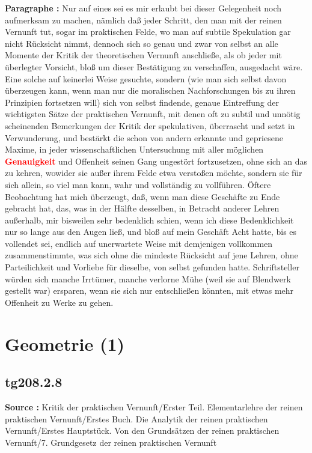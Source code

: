 \documentclass[a4paper,12pt,twoside]{book}
\newcommand{\match}[1]{\textcolor{red}{\textbf{#1}}}
\newcommand{\unnumberedsection}[1]{
	\section*{#1}
	\addcontentsline{toc}{section}{#1}
	\markright{#1}
}
\begin{document}
	\textbf{Paragraphe : }Nur auf eines sei es mir erlaubt bei dieser Gelegenheit noch aufmerksam zu machen, nämlich daß jeder Schritt, den man mit der reinen Vernunft tut, sogar im praktischen Felde, wo man auf subtile Spekulation gar nicht Rücksicht nimmt, dennoch sich so genau und zwar von selbst an alle Momente der Kritik der theoretischen Vernunft anschließe, als ob jeder mit überlegter Vorsicht, bloß um dieser Bestätigung zu verschaffen, ausgedacht wäre. Eine solche auf keinerlei Weise gesuchte, sondern (wie man sich selbst davon überzeugen kann, wenn man nur die moralischen Nachforschungen bis zu ihren Prinzipien fortsetzen will) sich von selbst findende, genaue Eintreffung der wichtigsten Sätze der praktischen Vernunft, mit denen oft zu subtil und unnötig scheinenden Bemerkungen der Kritik der spekulativen, überrascht und setzt in Verwunderung, und bestärkt die schon von andern erkannte und gepriesene Maxime, in jeder wissenschaftlichen Untersuchung mit aller möglichen \match{Genauigkeit} und Offenheit seinen Gang ungestört fortzusetzen,  ohne sich an das zu kehren, wowider sie außer ihrem Felde etwa verstoßen möchte, sondern sie für sich allein, so viel man kann, wahr und vollständig zu vollführen. Öftere Beobachtung hat mich überzeugt, daß, wenn man diese Geschäfte zu Ende gebracht hat, das, was in der Hälfte desselben, in Betracht anderer Lehren außerhalb, mir bisweilen sehr bedenklich schien, wenn ich diese Bedenklichkeit nur so lange aus den Augen ließ, und bloß auf mein Geschäft Acht hatte, bis es vollendet sei, endlich auf unerwartete Weise mit demjenigen vollkommen zusammenstimmte, was sich ohne die mindeste Rücksicht auf jene Lehren, ohne Parteilichkeit und Vorliebe für dieselbe, von selbst gefunden hatte. Schriftsteller würden sich manche Irrtümer, manche verlorne Mühe (weil sie auf Blendwerk gestellt war) ersparen, wenn sie sich nur entschließen könnten, mit etwas mehr Offenheit zu Werke zu gehen. 
	
	\unnumberedsection{Geometrie (1)} 
	\subsection*{tg208.2.8} 
	\textbf{Source : }Kritik der praktischen Vernunft/Erster Teil. Elementarlehre der reinen praktischen Vernunft/Erstes Buch. Die Analytik der reinen praktischen Vernunft/Erstes Hauptstück. Von den Grundsätzen der reinen praktischen Vernunft/7. Grundgesetz der reinen praktischen Vernunft\\  
	
\end{document}
